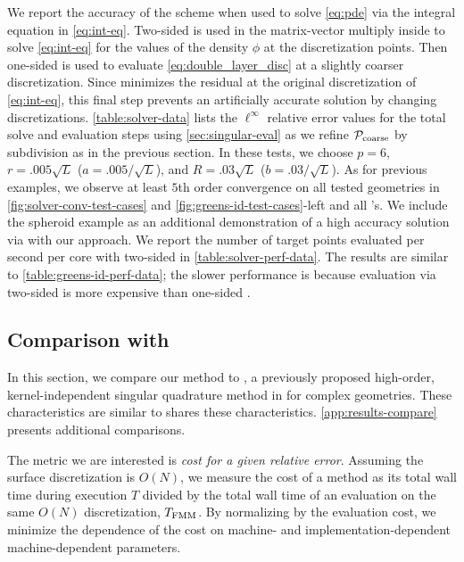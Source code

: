 We report the accuracy of the \qbkix scheme when used to solve \cref{eq:pde} via the integral equation in \cref{eq:int-eq}.
Two-sided \qbkix is used in the matrix-vector multiply inside \gmres to solve \cref{eq:int-eq} for the values of the density $\phi$ at the discretization points.
Then one-sided \qbkix is used to evaluate \cref{eq:double_layer_disc} at a slightly coarser discretization. 
Since \gmres minimizes the residual at the original discretization of \cref{eq:int-eq}, this final step prevents an artificially accurate solution by changing discretizations.
\cref{table:solver-data} lists the $\ell^\infty$ relative error values for the total solve and evaluation steps using \cref{sec:singular-eval} as we refine ${\mathcal{P}_{\mathrm{coarse}}}$ by subdivision as in the previous section.
In these tests, we choose $p=6$, $r= .005\sqrt{L}$ ($a = .005/\sqrt{L}$), and  $R= .03\sqrt{L}$ ($b = .03/\sqrt{L}$).
As for previous examples, we observe at least $5$th order convergence on all tested geometries in \cref{fig:solver-conv-test-cases} and \cref{fig:greens-id-test-cases}-left and all \pde's.
We include the spheroid example as an additional demonstration of a high accuracy solution via \gmres with our approach.
We report the number of target points evaluated per second per core with two-sided \qbkix in \cref{table:solver-perf-data}.
The results are similar to \cref{table:greens-id-perf-data}; the slower performance is because evaluation via two-sided \qbkix is more expensive than one-sided \qbkix.
\subsection{Comparison with \cite{YBZ}\label{sec:results-compare}}
In this section,  we compare our method to \cite{YBZ}, a previously proposed high-order, kernel-independent singular quadrature method in \threed for complex geometries. These characteristics are similar to  \qbkix shares these characteristics. \cref{app:results-compare} presents additional comparisons.


The metric we are interested is \textit{cost for a given relative error}.
Assuming the surface discretization is $O(N)$, we measure the cost of a method as its total wall time during execution $T$ divided by the total wall time of an \fmm evaluation on the same $O(N)$ discretization, $T_{\mathrm{FMM}}$. 
By normalizing by the \fmm evaluation cost, we minimize the dependence of the cost on machine- and implementation-dependent machine-dependent parameters.

